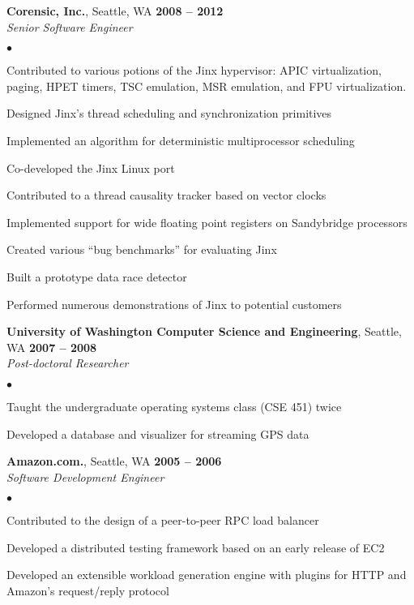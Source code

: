 \documentclass[margin,line]{res}
\newenvironment{list2}{
  \begin{list}{$\bullet$}{%
      \setlength{\itemsep}{0in}
      \setlength{\parsep}{0in} \setlength{\parskip}{0in}
      \setlength{\topsep}{0in} \setlength{\partopsep}{0in} 
      \setlength{\leftmargin}{0.2in}}}{\end{list}}
\begin{document}
\begin{resume}
\textbf{Corensic, Inc.}, Seattle, WA  \hfill \textbf{2008 -- 2012} \\\vspace{-4mm}
\textsl{Senior Software Engineer} \\
\begin{list2}
  \item Contributed to various potions of the Jinx hypervisor: APIC
    virtualization, paging,  HPET timers, TSC emulation, MSR emulation, and
    FPU virtualization.
  \item Designed Jinx's thread scheduling and synchronization primitives
  \item Implemented an algorithm for deterministic multiprocessor scheduling
  \item Co-developed the Jinx Linux port
  \item Contributed to a thread causality tracker based on vector clocks
  \item Implemented support for wide floating point registers on Sandybridge processors
  \item Created various ``bug benchmarks''  for evaluating Jinx
  \item Built a prototype data race detector
  \item Performed numerous demonstrations of Jinx to potential customers
\end{list2}

\textbf{University of Washington Computer Science and Engineering}, Seattle,
WA \hfill \textbf{2007 -- 2008}\\\vspace{-4mm}
\textsl{Post-doctoral Researcher} \\
\begin{list2}
    \item Taught the undergraduate operating systems class (CSE 451) twice
    \item Developed a database and visualizer for streaming GPS data
\end{list2}

\textbf{Amazon.com.}, Seattle, WA \hfill \textbf{2005 -- 2006} \\\vspace{-4mm}
\textsl{Software Development Engineer} \\
\begin{list2}
  \item Contributed to the design of a peer-to-peer RPC load balancer
  \item Developed a distributed testing framework based on an early release of EC2
  \item Developed an extensible workload generation engine with  plugins for
    HTTP and Amazon's request/reply protocol
\end{list2}


\end{resume}
\end{document}
